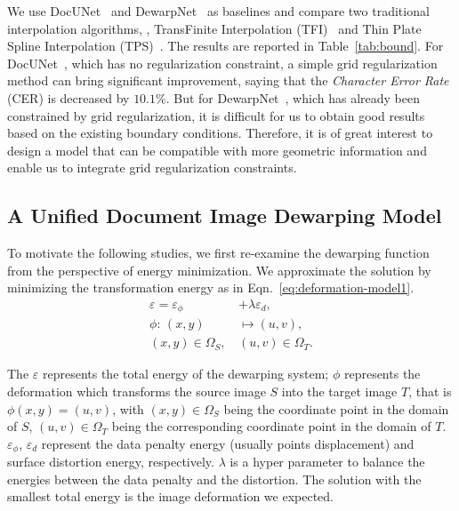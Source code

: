\documentclass[10pt,twocolumn,letterpaper]{article}
\begin{document}
We use DocUNet~\cite{Ma_2018_CVPR} and DewarpNet~\cite{Das_2019_ICCV} as baselines and compare two traditional interpolation algorithms, \ie, TransFinite Interpolation (TFI)~\cite{gordon1973transfinite} and Thin Plate Spline Interpolation (TPS)~\cite{bookstein1989principal}. The results are reported in Table~\ref{tab:bound}. 
For DocUNet~\cite{Ma_2018_CVPR}, which has no regularization constraint, a simple grid regularization method can bring significant improvement, saying that the {\em Character Error Rate} (CER) is decreased by $10.1\%$. But for DewarpNet~\cite{Das_2019_ICCV}, which has already been constrained by grid regularization, it is difficult for us to obtain good results based on the existing boundary conditions. Therefore,
it is of great interest to design a model that can be compatible with more geometric information and enable us to integrate grid regularization constraints.

\subsection{A Unified Document Image Dewarping Model}
To motivate the following studies, we first re-examine the dewarping function from the perspective of energy minimization. We approximate the solution by minimizing the transformation energy as in Eqn.~\eqref{eq:deformation-model1}. 
\vspace{-0.5em}
\begin{equation}
    \begin{split}
        \varepsilon = \varepsilon_{	\phi} &+ \lambda \varepsilon_{d},\\
        \phi : \, (x,y) &\mapsto  (u,v),\\
             (x,y)\in\Omega_S, \, &(u,v)\in\Omega_T.
    \end{split}
    \label{eq:deformation-model1}
\end{equation}



The $\varepsilon$ represents the total energy of the dewarping system; $\phi$ represents the deformation which transforms the source image $S$ into the target image $T$, that is $\phi(x,y) = (u,v)$, with $(x,y) \in \Omega_S$ being the coordinate point in the domain of $S$, $(u,v) \in \Omega_T$ being the corresponding coordinate point in the domain of $T$. $\varepsilon_{\phi}$, $\varepsilon_{d}$ represent the data penalty energy (usually points displacement) and surface distortion energy, respectively. $\lambda$ is a hyper parameter to balance the energies between the data penalty and the distortion. The solution with the smallest total energy is the image deformation we expected. 
\end{document}
